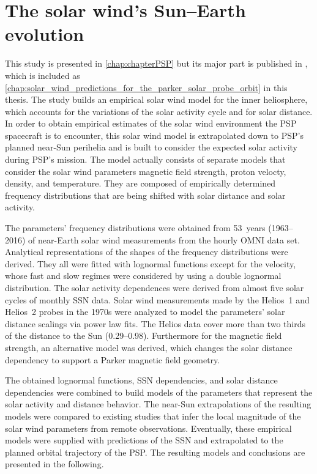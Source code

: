 \section{The solar wind's Sun--Earth evolution}
This study is presented in \autoref{chap:chapterPSP} but its major part is published in \citet{Venzmer2018}, which is included as \autoref{chap:solar_wind_predictions_for_the_parker_solar_probe_orbit} in this thesis.
The study builds an empirical solar wind model for the inner heliosphere, which accounts for the variations of the solar activity cycle and for solar distance. In order to obtain empirical estimates of the solar wind environment the PSP spacecraft is to encounter, this solar wind model is extrapolated down to PSP's planned near-Sun perihelia and is built to consider the expected solar activity during PSP's mission.
The model actually consists of separate models that consider the solar wind parameters magnetic field strength, proton velocty, density, and temperature. They are composed of empirically determined frequency distributions that are being shifted with solar distance and solar activity.

The parameters' frequency distributions were obtained from 53~years (1963--2016) of near-Earth solar wind measurements from the hourly OMNI data set. Analytical representations of the shapes of the frequency distributions were derived. They all were fitted with lognormal functions except for the velocity, whose fast and slow regimes were considered by using a double lognormal distribution. The solar activity dependences were derived from almost five solar cycles of monthly SSN data. Solar wind measurements made by the Helios~1 and Helios~2 probes in the 1970s were analyzed to model the parameters' solar distance scalings via power law fits. The Helios data cover more than two thirds of the distance to the Sun (\SIrange{0.29}{0.98}{\au}). Furthermore for the magnetic field strength, an alternative model was derived, which changes the solar distance dependency to support a Parker magnetic field geometry.

The obtained lognormal functions, SSN dependencies, and solar distance dependencies were combined to build models of the parameters that represent the solar activity and distance behavior. The near-Sun extrapolations of the resulting models were compared to existing studies that infer the local magnitude of the solar wind parameters from remote observations. Eventually, these empirical models were supplied with predictions of the SSN and extrapolated to the planned orbital trajectory of the PSP. The resulting models and conclusions are presented in the following.\\

